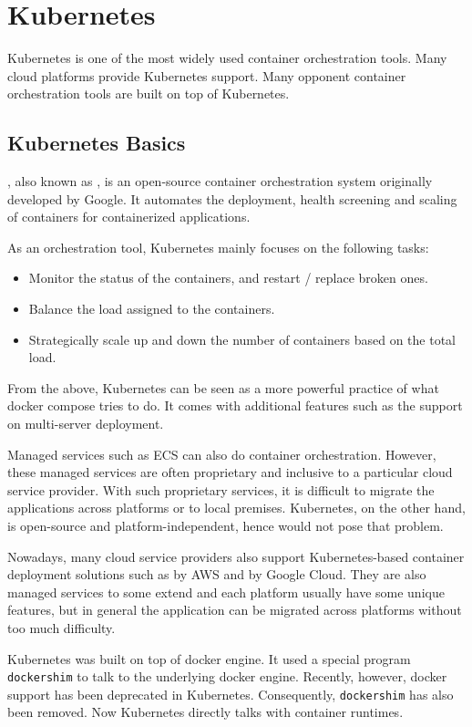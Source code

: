 \chapter{Kubernetes}

Kubernetes is one of the most widely used container orchestration tools. Many cloud platforms provide Kubernetes support. Many opponent container orchestration tools are built on top of Kubernetes.

\section{Kubernetes Basics}

, also known as , is an open-source container orchestration system originally developed by Google. It automates the deployment, health screening and scaling of containers for containerized applications.

As an orchestration tool, Kubernetes mainly focuses on the following tasks:
\begin{itemize}
	\item Monitor the status of the containers, and restart / replace broken ones.
	\item Balance the load assigned to the containers.
	\item Strategically scale up and down the number of containers based on the total load.
\end{itemize}
From the above, Kubernetes can be seen as a more powerful practice of what docker compose tries to do. It comes with additional features such as the support on multi-server deployment.

Managed services such as ECS can also do container orchestration. However, these managed services are often proprietary and inclusive to a particular cloud service provider. With such proprietary services, it is difficult to migrate the applications across platforms or to local premises. Kubernetes, on the other hand, is open-source and platform-independent, hence would not pose that problem.

Nowadays, many cloud service providers also support Kubernetes-based container deployment solutions such as  by AWS and  by Google Cloud. They are also managed services to some extend and each platform usually have some unique features, but in general the application can be migrated across platforms without too much difficulty.

\begin{shortbox}
	
	Kubernetes was built on top of docker engine. It used a special program \verb|dockershim| to talk to the underlying docker engine. Recently, however, docker support has been deprecated in Kubernetes. Consequently, \verb|dockershim| has also been removed. Now Kubernetes directly talks with container runtimes.
\end{shortbox}



